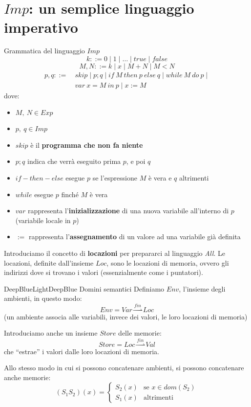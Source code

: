 \documentclass[a4paper,11pt]{report}
\newcommand{\farrow}{\overset{fin}{\rightharpoonup}}
\begin{document}
\section{\( Imp \): un semplice linguaggio imperativo}
\begin{defframe}{Grammatica del linguaggio \( Imp \)}{}
    \[ 
        k ::= 0 \mid 1 \mid \dots \mid true \mid false
    \]
    \[
        M, N ::= k \mid x \mid M + N \mid M < N
    \]
    \vspace{-2em}
    \begin{align*}
        p, q ::= \ &skip \mid p;q \mid if \ M \ then \ p \ else \ q \mid while \ M \ do \ p \mid \\
                                                                        &var \ x = M \ in \ p \mid x:= M
    \end{align*}
    dove:
    \begin{itemize}
        \item \( M, \ N \in Exp\) 
        \item \( p, \ q \in Imp\) 
        \item \( skip \) è il \textbf{programma che non fa niente}
        \item \( p;q \) indica che verrà eseguito prima \( p \), e poi \( q \)
        \item \( if-then-else \) esegue \( p \) se l'espressione \( M \) è vera e \( q \) altrimenti
        \item \( while \) esegue \( p \) finché \( M \) è vera
        \item \( var \) rappresenta l'\textbf{inizializzazione} di una nuova variabile all'interno di \( p \) (variabile locale in \( p \))
        \item \( := \) rappresenta l'\textbf{assegnamento} di un valore ad una variabile già definita
    \end{itemize}
\end{defframe}

Introduciamo il concetto di \textbf{locazioni} per prepararci al linguaggio \textit{All}. Le locazioni, definite dall'insieme \( Loc \), sono le locazioni di memoria, ovvero gli indirizzi dove si trovano i valori {\color{gray}\small (essenzialmente come i puntatori)}.


\begin{cframe}{DeepBlueLight}{DeepBlue} {Domini semantici}
    Definiamo \( Env \), l'insieme degli ambienti, in questo modo:
    \[ Env = Var \farrow Loc \]
    (un ambiente associa alle variabili, invece dei valori, le loro locazioni di memoria)

    Introduciamo anche un insieme \( Store \) delle memorie:
    \[ Store = Loc \farrow Val \]
    che ``estrae'' i valori dalle loro locazioni di memoria.

    Allo stesso modo in cui si possono concatenare ambienti, si possono concatenare anche memorie:
    \[ (S_1 S_2)(x) = \begin{cases}
        S_2(x) & \text{se } x\in dom(S_2) \\
        S_1(x) & \text{altrimenti}
    \end{cases}
\]
\end{cframe}
\end{document}
